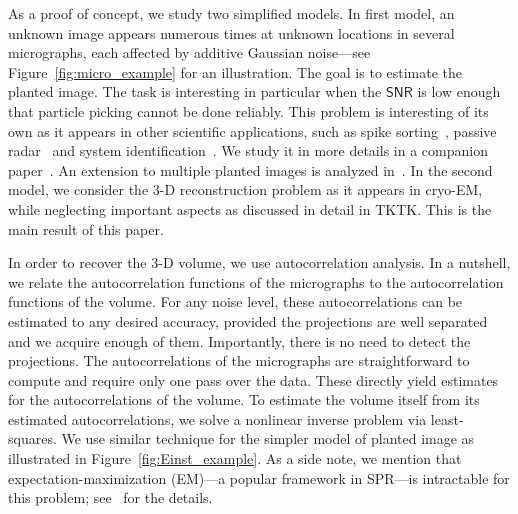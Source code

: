 \documentclass[english,11pt]{article}
\newcommand{\1}{\mathbf{1}}
\newcommand{\TODO}[1]{{\color{red}{[#1]}}}
\numberwithin{equation}{section}
\theoremstyle{plain}
\theoremstyle{definition}
\theoremstyle{remark}
\theoremstyle{plain}
\theoremstyle{remark}
\theoremstyle{plain}
\theoremstyle{plain}
\newcommand{\SNR}{\ensuremath{\textsf{SNR}}}
\begin{document}
As a proof of concept, we study two simplified models.
In first model, an unknown image appears numerous times at unknown locations in several micrographs, each affected by additive Gaussian noise---see Figure~\ref{fig:micro_example} for an illustration.
The goal is to estimate the planted image. The task is interesting in particular when the $\SNR$ is low enough that particle picking cannot be done reliably. This problem is interesting of its own as it appears in other scientific applications, such as spike sorting~\cite{lewicki1998review}, passive radar~\cite{gogineni2017passive} and system identification~\cite{ljung1998system}. We study it in more details in a companion paper~\cite{bendory2018estimation}. An extension to multiple planted images is analyzed in~\cite{bendory2018estimation}.
In the second model, we consider the 3-D reconstruction problem as it appears in cryo-EM, while neglecting important aspects as discussed in detail in TKTK. \TODO{Here we need to elaborate a bit.} This is the main result of this paper. \TODO{We probably need to switch the order of this paragraph.}


In order to recover the 3-D volume, we use autocorrelation analysis. In a nutshell, we relate the autocorrelation functions of the micrographs to the autocorrelation functions of the volume.
For any noise level, these autocorrelations can be estimated to any desired accuracy, provided the projections are well separated and we acquire enough of them. Importantly, there is no need to detect the projections. The autocorrelations of the micrographs are straightforward to compute and require only one pass over the data. These directly yield estimates for the autocorrelations of the volume. To estimate the volume itself from its estimated autocorrelations, we solve a nonlinear inverse problem via least-squares. 
We use similar technique for the simpler model of planted image as illustrated in Figure~\ref{fig:Einst_example}. As a side note, we mention that expectation-maximization (EM)---a popular framework in SPR---is intractable for this problem; see~\cite{bendory2018estimation} for the details.
\end{document}
